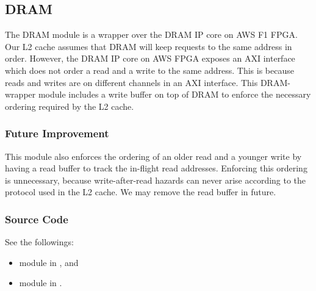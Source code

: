 \subsection{DRAM}

The DRAM module is a wrapper over the DRAM IP core on AWS F1 FPGA.
Our L2 cache assumes that DRAM will keep requests to the same address in order.
However, the DRAM IP core on AWS FPGA exposes an AXI interface which does not order a read and a write to the same address.
This is because reads and writes are on different channels in an AXI interface.
This DRAM-wrapper module includes a write buffer on top of DRAM to enforce the necessary ordering required by the L2 cache.

\subsubsection{Future Improvement}
This module also enforces the ordering of an older read and a younger write by having a read buffer to track the in-flight read addresses.
Enforcing this ordering is unnecessary, because write-after-read hazards can never arise according to the protocol used in the L2 cache.
We may remove the read buffer in future.

\subsubsection{Source Code}
See the followings:
\begin{itemize}
    \item module  in , and
    \item module  in .
\end{itemize}
